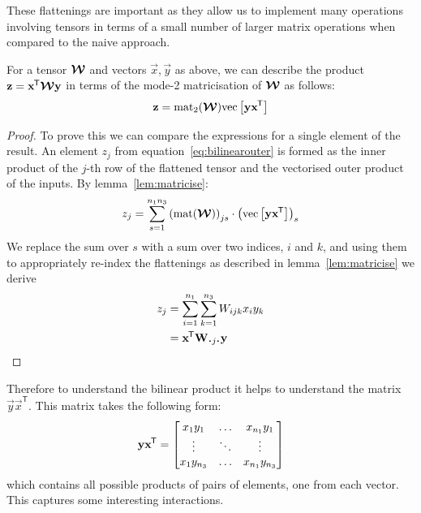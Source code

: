 These flattenings are important as they allow us to
implement many operations involving tensors in terms of a small number of larger matrix
operations when compared to the naive approach.

\begin{lem}\label{lem:outerprod}
For a tensor \(\bm{\mathcal{W}}\) and vectors \(\vec{x}, \vec{y}\) as above,
we can describe the product \(\mathbf{z} = \mathbf{x}^{\mkern-1.5mu\mathsf{T}}\bm{\mathcal{W}}\mathbf{y}\) in terms of the
mode-2 matricisation of \(\bm{\mathcal{W}}\) as 
follows:
\begin{align}
	\mathbf{z} = \operatorname{mat}_2(\bm{\mathcal{W}})\mathrm{vec}\left[\mathbf{y}\mathbf{x}^{\mkern-1.5mu\mathsf{T}}\right]
	\label{eq:bilinearouter}
\end{align}
\end{lem}

\begin{proof}
To
prove this we can compare the expressions for a single element of the result.
An element \(z_j\) from equation~\eqref{eq:bilinearouter}
is formed as the inner product of the \(j\)-th
row of the flattened tensor and the vectorised outer product of the inputs. By 
lemma~\ref{lem:matricise}:
\begin{equation}
	z_j = 
	\sum_{s=1}^{n_1n_3} \left(\operatorname{mat}(\bm{\mathcal{W}})\right)_{js} \cdot
	\left( \operatorname{vec}\left[\mathbf{y}\mathbf{x}^{\mkern-1.5mu\mathsf{T}}\right]\right)_s
\end{equation}
We replace the sum over \(s\) with a sum over two
indices, \(i\) and \(k\), and using them to appropriately re-index the flattenings 
as described in lemma~\ref{lem:matricise} we 
derive
\begin{align}
	z_j &= \sum_{i=1}^{n_1}\sum_{k=1}^{n_3} W_{ijk} x_i y_k \\
		&= \tran{\vec{x}}\mat{W}_{\midbullet j \midbullet}\vec{y}
\end{align}

\end{proof}


Therefore to understand the bilinear product it helps to understand the matrix 
\(\vec{y}\vec{x}^\mathsf{T}\). This matrix takes the following form:
\begin{equation}\label{eq:outer}
	\mathbf{y}\mathbf{x}^{\mkern-1.5mu\mathsf{T}} = \begin{bmatrix}
		x_1y_1 & \ldots & x_{n_1}y_1 \\
		\vdots & \ddots & \vdots \\
		x_1y_{n_3} & \ldots & x_{n_1}y_{n_3}
	\end{bmatrix}
\end{equation} which contains all possible products of pairs of elements, one from each vector. 
This captures some interesting interactions.

